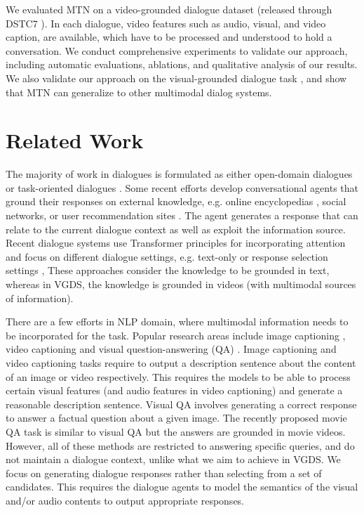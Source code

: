 \documentclass[11pt,a4paper]{article}
\begin{document}
We evaluated MTN on a video-grounded dialogue dataset (released through DSTC7 \cite{DSTC7}). In each dialogue, video features such as audio, visual, and video caption, are available, which have to be processed and understood to hold a conversation. We conduct comprehensive experiments to validate our approach, including automatic evaluations, ablations, and qualitative analysis of our results. We also validate our approach on the visual-grounded dialogue task \cite{das2017visual}, and show that MTN can generalize to other multimodal dialog systems. 

\section{Related Work}
The majority of work in dialogues is formulated as either open-domain dialogues \cite{shang2015,vinyals15neural,YaoZP15, li2016diversity,li2016personas,serban17latent,serban16hierarchical} or task-oriented dialogues \cite{henderson2014wordbaseddst, Bordes2016LearningEG,Fatemi2016,liu2017end,lei2018sequicity,madotto2018mem2seq}. 
Some recent efforts develop conversational agents that ground their responses on external knowledge, e.g. online encyclopedias \cite{dinan2018wizard}, social networks, or user recommendation sites \cite{ghazvininejad17knowledge}. The agent generates a response that can relate to the current dialogue context as well as exploit the information source. Recent dialogue systems use Transformer principles \cite{vaswani17attention} for incorporating attention and focus on different dialogue settings, e.g. text-only or response selection settings \cite{zhu2018sdnet,mazare2018training,dinan2018wizard},
These approaches consider the knowledge to be grounded in text, whereas in VGDS, the knowledge is grounded in videos (with multimodal sources of information). 

There are a few efforts in NLP domain, where multimodal information needs to be incorporated for the task.
Popular research areas include image captioning \cite{vinyals2015show,xu2015show}, video captioning \cite{hori2017attention,li2018jointly} and visual question-answering (QA) \cite{antol2015vqa,goyal2017making}. 
Image captioning and video captioning tasks require to output a description sentence about the content of an image or video respectively. This requires the models to be able to process certain visual features (and audio features in video captioning) and generate a reasonable description sentence. Visual QA involves generating a correct response to answer a factual question about a given image. The recently proposed movie QA \cite{MovieQA} task is similar to visual QA but the answers are grounded in movie videos. However, all of these methods are restricted to answering specific queries, and do not maintain a dialogue context, unlike what we aim to achieve in VGDS. We focus on generating dialogue responses rather than selecting from a set of candidates. This requires the dialogue agents to model the semantics of the visual and/or audio contents to output appropriate responses.
\end{document}
